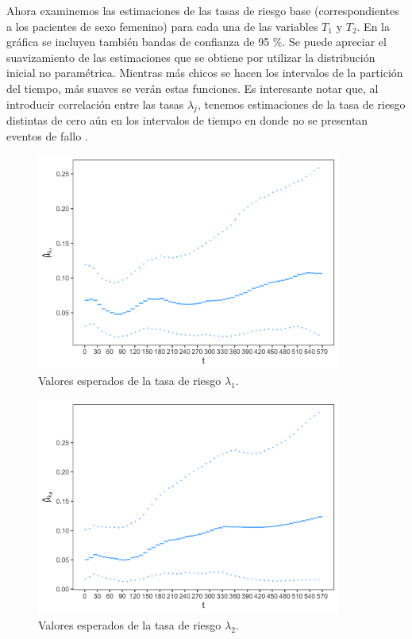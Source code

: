 \documentclass[11pt,a4paper]{article}
\begin{document}
Ahora examinemos las estimaciones de las tasas de riesgo base (correspondientes a los pacientes de sexo femenino) para cada una de las variables $T_1$ y $T_2$. En la gráfica se incluyen también bandas de confianza de 95 \%. Se puede apreciar el suavizamiento de las estimaciones que se obtiene por utilizar la distribución inicial no paramétrica. Mientras más chicos se hacen los intervalos de la partición del tiempo, más suaves se verán estas funciones. Es interesante notar que, al introducir correlación entre las tasas $\lambda_j$, tenemos estimaciones de la tasa de riesgo distintas de cero aún en los intervalos de tiempo en donde no se presentan eventos de fallo \citep{nieto}.\\

\begin{figure}
\centering\includegraphics[width=10cm]{hazard1.png}
\caption{Valores esperados de la tasa de riesgo $\lambda_1$.}
\label{fig:haz_lambda1}
\end{figure}

\begin{figure}
\centering\includegraphics[width=10cm]{hazard2.png}
\caption{Valores esperados de la tasa de riesgo $\lambda_2$.}
\label{fig:haz_lambda2}
\end{figure}
\end{document}
